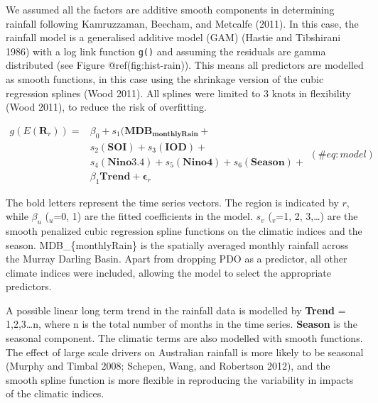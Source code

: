 \documentclass[fleqn,10pt,lineno]{wlpeerj} %
\begin{document}
We assumed all the factors are additive smooth components in determining
rainfall following Kamruzzaman, Beecham, and Metcalfe (2011). In this
case, the rainfall model is a generalised additive model (GAM) (Hastie
and Tibshirani 1986) with a log link function \texttt{g()} and assuming
the residuals are gamma distributed (see Figure @ref(fig:hist-rain)).
This means all predictors are modelled as smooth functions, in this case
using the shrinkage version of the cubic regression splines (Wood 2011).
All splines were limited to 3 knots in flexibility (Wood 2011), to
reduce the risk of overfitting. \vspace{0.5cm}

\begin{equation}
\begin{array}{lll}
g(E(\mathbf{R}_r)) = &\beta_0 + s_1(\mathbf{MDB_{monthlyRain}} + \\ &s_2(\mathbf{SOI}) + s_3(\mathbf{IOD}) + \\                &s_4(\mathbf{Nino3.4}) + s_5(\mathbf{Nino4}) + s_6(\mathbf{Season}) + \\
           &\beta_1\mathbf{Trend} + \boldsymbol{\epsilon}_r
\end{array}
(\#eq:model)
\end{equation}

The bold letters represent the time series vectors. The region is
indicated by \(r\), while \(\beta_u\) (\(_u\)=0, 1) are the fitted
coefficients in the model. \(s_v\) (\(_v\)=1, 2, 3,\ldots{}) are the
smooth penalized cubic regression spline functions on the climatic
indices and the season. MDB\_\{monthlyRain\} is the spatially averaged
monthly rainfall across the Murray Darling Basin. Apart from dropping
PDO as a predictor, all other climate indices were included, allowing
the model to select the appropriate predictors.

A possible linear long term trend in the rainfall data is modelled by
\textbf{Trend} = 1,2,3\ldots{}n, where n is the total number of months
in the time series. \textbf{Season} is the seasonal component. The
climatic terms are also modelled with smooth functions. The effect of
large scale drivers on Australian rainfall is more likely to be seasonal
(Murphy and Timbal 2008; Schepen, Wang, and Robertson 2012), and the
smooth spline function is more flexible in reproducing the variability
in impacts of the climatic indices.
\end{document}
